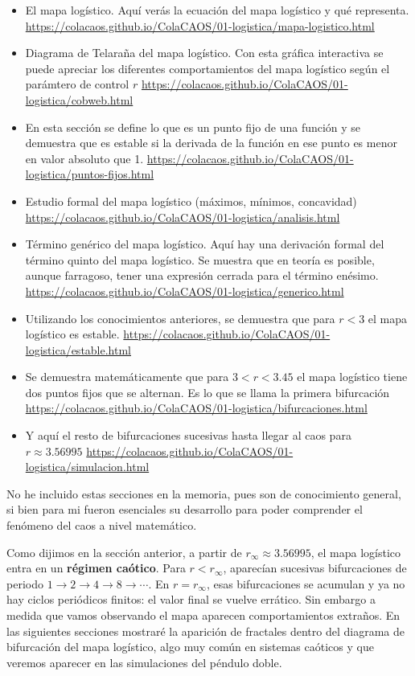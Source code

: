 \documentclass[
  10pt,
  a4paper,
  DIV=11,
  numbers=noendperiod,
  open=any]{scrreprt}
\numberwithin{equation}{chapter}
\numberwithin{equation}{section}
\renewcommand{\[}{\begin{equation}}
\renewcommand{\]}{\end{equation}}
\begin{document}
\begin{itemize}
\item
  El mapa logístico. Aquí verás la ecuación del mapa logístico y qué representa.
  \url{https://colacaos.github.io/ColaCAOS/01-logistica/mapa-logistico.html}
\item
  Diagrama de Telaraña del mapa logístico. Con esta gráfica interactiva se puede apreciar los diferentes comportamientos del mapa logístico según el parámtero de control $r$
  \url{https://colacaos.github.io/ColaCAOS/01-logistica/cobweb.html}
\item
  En esta sección se define lo que es un punto fijo de una función y se demuestra que es estable si la derivada de la función en ese punto es menor en valor absoluto que 1. 
  \url{https://colacaos.github.io/ColaCAOS/01-logistica/puntos-fijos.html}
\item
  Estudio formal del mapa logístico (máximos, mínimos, concavidad)
  \url{https://colacaos.github.io/ColaCAOS/01-logistica/analisis.html}
\item
  Término genérico del mapa logístico. Aquí hay una derivación formal del término quinto del mapa logístico. Se muestra que en teoría es posible, aunque farragoso, tener una expresión cerrada para el término enésimo. 
  \url{https://colacaos.github.io/ColaCAOS/01-logistica/generico.html}
\item
  Utilizando los conocimientos anteriores, se demuestra que para $r < 3$ el mapa logístico es estable. 
  \url{https://colacaos.github.io/ColaCAOS/01-logistica/estable.html}
\item
  Se demuestra matemáticamente que para  $3 < r < 3.45$ el mapa logístico tiene dos puntos fijos que se alternan. Es lo que se llama la primera bifurcación
  \url{https://colacaos.github.io/ColaCAOS/01-logistica/bifurcaciones.html} 
\item
  Y aquí el resto de bifurcaciones sucesivas hasta llegar al caos para $r \approx 3.56995$  
  \url{https://colacaos.github.io/ColaCAOS/01-logistica/simulacion.html} 
\end{itemize}

No he incluido estas secciones en la memoria, pues son de conocimiento general, si bien para mi fueron esenciales su desarrollo para poder comprender el fenómeno del caos a nivel matemático. 


Como dijimos en la sección anterior, a partir de
\(r_\infty \approx 3.56995\), el mapa logístico entra en un
\textbf{régimen caótico}. Para \(r < r_\infty\), aparecían sucesivas
bifurcaciones de periodo \(1 \to 2 \to 4 \to 8 \to \cdots\). En
\(r = r_\infty\), esas bifurcaciones se acumulan y ya no hay ciclos
periódicos finitos: el valor final se vuelve errático. Sin embargo a
medida que vamos observando el mapa aparecen comportamientos extraños. En las siguientes secciones mostraré la aparición de fractales dentro del diagrama de bifurcación del mapa logístico, algo muy común en sistemas caóticos y que veremos aparecer en las simulaciones del péndulo doble. 
\end{document}
